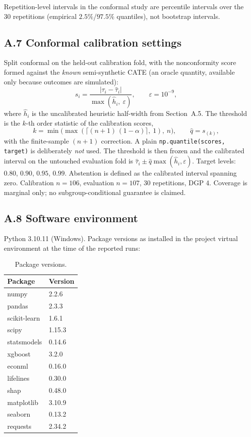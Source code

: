 Repetition-level intervals in the conformal study are percentile intervals over
the 30 repetitions (empirical $2.5\%$/$97.5\%$ quantiles), not bootstrap
intervals.

\subsection*{A.7 Conformal calibration settings}

Split conformal on the held-out calibration fold, with the nonconformity score
formed against the \emph{known} semi-synthetic CATE (an oracle quantity,
available only because outcomes are simulated):
\[
s_i = \frac{|\tau_i - \hat{\tau}_i|}{\max(\hat{h}_i,\ \varepsilon)},
\qquad \varepsilon = 10^{-9},
\]
where $\hat{h}_i$ is the uncalibrated heuristic half-width from
Section~A.5. The threshold is the $k$-th order statistic of the calibration
scores,
\[
k = \min\!\big(\max(\lceil (n+1)\,(1-\alpha) \rceil,\ 1),\ n\big),
\qquad \hat{q} = s_{(k)},
\]
with the finite-sample $(n+1)$ correction. A plain
\texttt{np.quantile(scores, target)} is deliberately \emph{not} used. The
threshold is then frozen and the calibrated interval on the untouched
evaluation fold is $\hat{\tau}_i \pm \hat{q}\max(\hat{h}_i, \varepsilon)$.
Target levels: $0.80$, $0.90$, $0.95$, $0.99$. Abstention is defined as the
calibrated interval spanning zero. Calibration $n = 106$, evaluation
$n = 107$, 30 repetitions, DGP 4. Coverage is marginal only; no
subgroup-conditional guarantee is claimed.

\subsection*{A.8 Software environment}

Python 3.10.11 (Windows). Package versions as installed in the project virtual
environment at the time of the reported runs:

\begin{table}[H]
\centering\small
\caption{Package versions.}
\begin{tabular}{@{}ll@{}}
\toprule
Package & Version \\
\midrule
numpy & 2.2.6 \\
pandas & 2.3.3 \\
scikit-learn & 1.6.1 \\
scipy & 1.15.3 \\
statsmodels & 0.14.6 \\
xgboost & 3.2.0 \\
econml & 0.16.0 \\
lifelines & 0.30.0 \\
shap & 0.48.0 \\
matplotlib & 3.10.9 \\
seaborn & 0.13.2 \\
requests & 2.34.2 \\
\bottomrule
\end{tabular}
\end{table}


